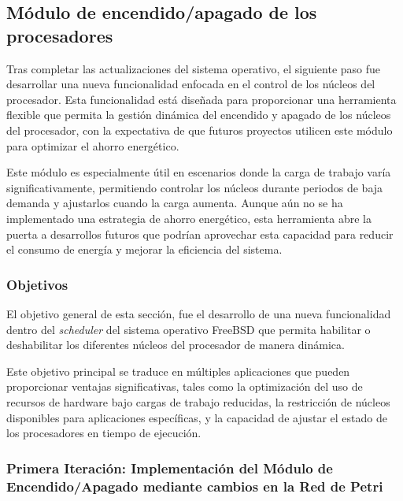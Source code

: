 \subsection{Módulo de encendido/apagado de los procesadores}

Tras completar las actualizaciones del sistema operativo, el siguiente paso fue desarrollar una nueva funcionalidad enfocada en el control de los núcleos del procesador. Esta funcionalidad está diseñada para proporcionar una herramienta flexible que permita la gestión dinámica del encendido y apagado de los núcleos del procesador, con la expectativa de que futuros proyectos utilicen este módulo para optimizar el ahorro energético.

Este módulo es especialmente útil en escenarios donde la carga de trabajo varía significativamente, permitiendo controlar los núcleos durante periodos de baja demanda y ajustarlos cuando la carga aumenta. Aunque aún no se ha implementado una estrategia de ahorro energético, esta herramienta abre la puerta a desarrollos futuros que podrían aprovechar esta capacidad para reducir el consumo de energía y mejorar la eficiencia del sistema.

\subsubsection{Objetivos}

El objetivo general de esta sección, fue el desarrollo de una nueva funcionalidad dentro del \textit{scheduler} del sistema operativo FreeBSD que permita habilitar o deshabilitar los diferentes núcleos del procesador de manera dinámica.

Este objetivo principal se traduce en múltiples aplicaciones que pueden proporcionar ventajas significativas, tales como la optimización del uso de recursos de hardware bajo cargas de trabajo reducidas, la restricción de núcleos disponibles para aplicaciones específicas, y la capacidad de ajustar el estado de los procesadores en tiempo de ejecución.

\subsubsection{Primera Iteración: Implementación del Módulo de Encendido/Apagado mediante cambios en la Red de Petri}

